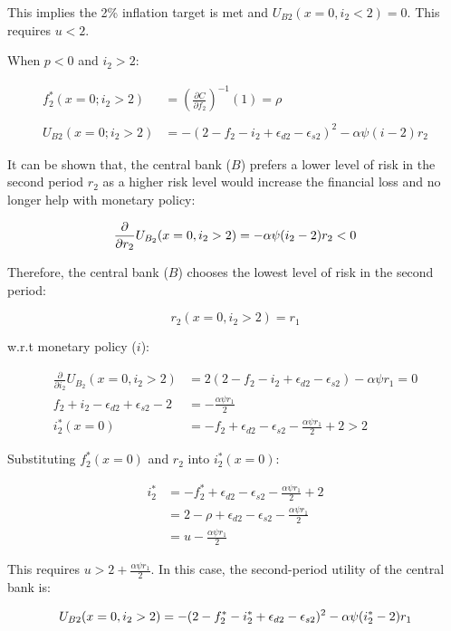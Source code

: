 \documentclass[
  a4paper,
  abstract=true]{scrartcl}
\theoremstyle{definition}
\begin{document}
This implies the 2\% inflation target is met and
\(U_{B2}(x=0,i_2<2)=0\). This requires \(u<2\).

When \(p<0\) and \(i_2>2\):

\begin{align*}
f^*_2(x=0;i_2>2)&=\left( \frac{\partial C}{\partial f_2} \right)^{-1}(1)=\rho \\ \\
U_{B2}(x=0;i_2>2) &=-(2-f_2-i_2+\epsilon_{d2}-\epsilon_{s2})^2-\alpha\psi(i-2)r_2
\end{align*}

It can be shown that, the central bank (\(B\)) prefers a lower level of
risk in the second period \(r_2\) as a higher risk level would increase
the financial loss and no longer help with monetary policy:

\[
\frac{\partial}{\partial r_2} U_{B_2}(x=0,i_2>2) = -\alpha\psi(i_2-2)r_2<0 \\
\]

Therefore, the central bank (\(B\)) chooses the lowest level of risk in
the second period:

\[
r_2(x=0,i_2>2)=r_1
\]

w.r.t monetary policy (\(i\)):

\begin{align}
\frac{\partial}{\partial i_2} U_{B_2}(x=0,i_2>2)&=2(2-f_2-i_2+\epsilon_{d2}-\epsilon_{s2})-\alpha\psi r_1=0 \nonumber \\
f_2+i_2-\epsilon_{d2}+\epsilon_{s2}-2&=-\frac{\alpha\psi r_1}{2} \nonumber \\
i^*_2(x=0) &= -f_2+\epsilon_{d2}-\epsilon_{s2}-\frac{\alpha\psi r_1}{2}+2>2 \label{eq-i2x0}
\end{align}

Substituting \(f^*_2(x=0)\) and \(r_2\) into \(i_2^*(x=0)\):

\begin{align*}
i^*_2 &= -f^*_2+\epsilon_{d2}-\epsilon_{s2}-\frac{\alpha\psi r_1}{2}+2 \\
&=2-\rho+\epsilon_{d2}-\epsilon_{s2}-\frac{\alpha\psi r_1}{2}\\
&=u-\frac{\alpha\psi r_1}{2}
\end{align*}

This requires \(u>2+\frac{\alpha\psi r_1}{2}\). In this case, the
second-period utility of the central bank is:

\[
U_{B2}(x=0,i_2>2)=-(2-f_2^*-i_2^*+\epsilon_{d2}-\epsilon_{s2})^2-\alpha\psi(i^*_2-2)r_1 \\
\]
\end{document}
